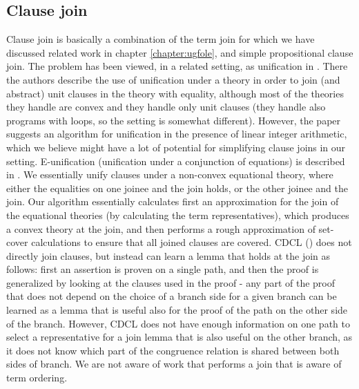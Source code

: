 \subsection{Clause join}
Clause join is basically a combination of the term join for which we have discussed related work in chapter \ref{chapter:ugfole}, 
and simple propositional clause join.
The problem has been viewed, in a related setting, as unification in \cite{DBLP:conf/vmcai/GulwaniT07}.
There the authors describe the use of unification under a theory in order to join (and abstract) unit clauses in the theory with equality, although most of the theories they handle are convex and they handle only unit clauses (they handle also programs with loops, so the setting is somewhat different). However, the paper suggests an algorithm for unification in the presence of linear integer arithmetic, which we believe might have a lot of potential for simplifying clause joins in our setting.
E-unification (unification under a conjunction of equations) is described in \cite{Baader2001445}.
We essentially unify clauses under a non-convex equational theory, where either the equalities on one joinee and the join holds, or the other joinee and the join.
Our algorithm essentially calculates first an approximation for the join of the equational theories (by calculating the term representatives), which produces a convex theory at the join, and then performs a rough approximation of set-cover calculations to ensure that all joined clauses are covered. 
CDCL (\cite{GRASP}) does not directly join clauses, but instead can learn a lemma that holds at the join as follows: first an assertion is proven on a single path, and then the proof is generalized by looking at the clauses used in the proof - any part of the proof that does not depend on the choice of a branch side for a given branch can be learned as a lemma that is useful also for the proof of the path on the other side of the branch. However, CDCL does not have enough information on one path to select a representative for a join lemma that is also useful on the other branch, as it does not know which part of the congruence relation is shared between both sides of  branch. 
We are not aware of work that performs a join that is aware of term ordering.

